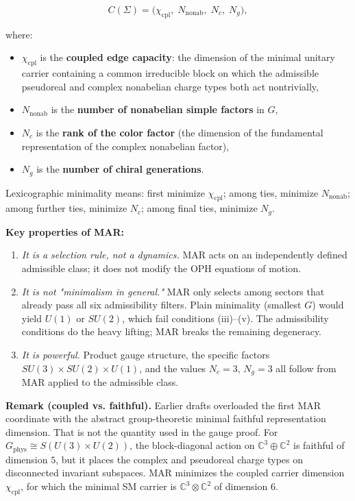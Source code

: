 \[C(\Sigma) = \bigl(\chi_{\mathrm{cpl}},\; N_{\mathrm{nonab}},\; N_c,\; N_g\bigr),\]

where:

\begin{itemize}
\tightlist
\item
  \(\chi_{\mathrm{cpl}}\) is the \textbf{coupled edge capacity}: the dimension of the minimal unitary carrier containing a common irreducible block on which the admissible pseudoreal and complex nonabelian charge types both act nontrivially,
\item
  \(N_{\mathrm{nonab}}\) is the \textbf{number of nonabelian simple factors} in \(G\),
\item
  \(N_c\) is the \textbf{rank of the color factor} (the dimension of the fundamental representation of the complex nonabelian factor),
\item
  \(N_g\) is the \textbf{number of chiral generations}.
\end{itemize}

Lexicographic minimality means: first minimize \(\chi_{\mathrm{cpl}}\); among ties, minimize \(N_{\mathrm{nonab}}\); among further ties, minimize \(N_c\); among final ties, minimize \(N_g\).

\textbf{Key properties of MAR:}

\begin{enumerate}
\def\labelenumi{\arabic{enumi}.}
\item
  \emph{It is a selection rule, not a dynamics.} MAR acts on an independently defined admissible class; it does not modify the OPH equations of motion.
\item
  \emph{It is not "minimalism in general."} MAR only selects among sectors that already pass all six admissibility filters. Plain minimality (smallest \(G\)) would yield \(U(1)\) or \(SU(2)\), which fail conditions (iii)--(v). The admissibility conditions do the heavy lifting; MAR breaks the remaining degeneracy.
\item
  \emph{It is powerful.} Product gauge structure, the specific factors \(SU(3) \times SU(2) \times U(1)\), and the values \(N_c = 3\), \(N_g = 3\) all follow from MAR applied to the admissible class.
\end{enumerate}

\textbf{Remark (coupled vs. faithful).} Earlier drafts overloaded the first MAR coordinate with the abstract group-theoretic minimal faithful representation dimension. That is not the quantity used in the gauge proof. For \(G_{\mathrm{phys}} \cong S(U(3) \times U(2))\), the block-diagonal action on \(\mathbb{C}^3 \oplus \mathbb{C}^2\) is faithful of dimension \(5\), but it places the complex and pseudoreal charge types on disconnected invariant subspaces. MAR minimizes the coupled carrier dimension \(\chi_{\mathrm{cpl}}\), for which the minimal SM carrier is \(\mathbb{C}^3 \otimes \mathbb{C}^2\) of dimension \(6\).

